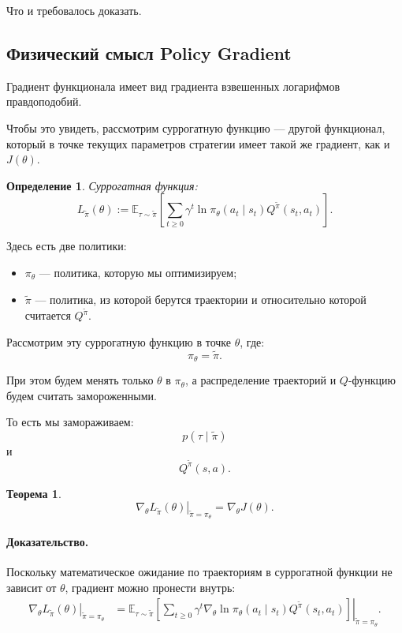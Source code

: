 \documentclass[12pt,a4paper]{article}
\newtheorem{theorem}{Теорема}
\newtheorem{definition}{Определение}
\begin{document}
Что и требовалось доказать.

\subsection{Физический смысл Policy Gradient}

Градиент функционала имеет вид градиента взвешенных логарифмов правдоподобий.

Чтобы это увидеть, рассмотрим суррогатную функцию --- другой функционал, который в точке текущих параметров стратегии имеет такой же градиент, как и $J(\theta)$.

\begin{definition}
Суррогатная функция:
\[
L_{\tilde\pi}(\theta)
:=
\mathbb E_{\tau\sim\tilde\pi}
\left[
\sum_{t\ge 0}
\gamma^t
\ln \pi_\theta(a_t\mid s_t)
Q^{\tilde\pi}(s_t,a_t)
\right].
\]
\end{definition}

Здесь есть две политики:
\begin{itemize}
    \item $\pi_\theta$ --- политика, которую мы оптимизируем;
    \item $\tilde\pi$ --- политика, из которой берутся траектории и относительно которой считается $Q^{\tilde\pi}$.
\end{itemize}

Рассмотрим эту суррогатную функцию в точке $\theta$, где:
\[
\pi_\theta=\tilde\pi.
\]

При этом будем менять только $\theta$ в $\pi_\theta$, а распределение траекторий и $Q$-функцию будем считать замороженными.

То есть мы замораживаем:
\[
p(\tau\mid \tilde\pi)
\]
и
\[
Q^{\tilde\pi}(s,a).
\]

\begin{theorem}
\[
\left.
\nabla_\theta L_{\tilde\pi}(\theta)
\right|_{\tilde\pi=\pi_\theta}
=
\nabla_\theta J(\theta).
\]
\end{theorem}

\paragraph{Доказательство.}

Поскольку математическое ожидание по траекториям в суррогатной функции не зависит от $\theta$, градиент можно пронести внутрь:
\[
\begin{aligned}
\left.
\nabla_\theta L_{\tilde\pi}(\theta)
\right|_{\tilde\pi=\pi_\theta}
&=
\left.
\mathbb E_{\tau\sim\tilde\pi}
\left[
\sum_{t\ge 0}
\gamma^t
\nabla_\theta
\ln \pi_\theta(a_t\mid s_t)
Q^{\tilde\pi}(s_t,a_t)
\right]
\right|_{\tilde\pi=\pi_\theta}.
\end{aligned}
\]
\end{document}
